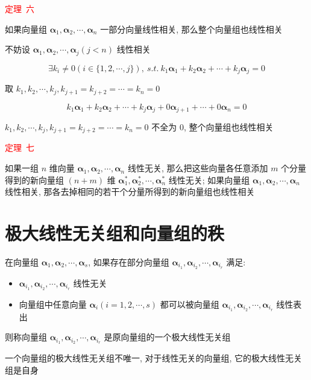 \begin{theorem}[判别线性相关性的七大定理]
	\textcolor{red}{定理\ 六}
	
	如果向量组 $\boldsymbol{\alpha}_{1},\boldsymbol{\alpha}_{2}, \cdots, \boldsymbol{\alpha}_{n}$ 一部分向量线性相关, 那么整个向量组也线性相关
	
	\begin{anymark}[证明]
		不妨设 $\boldsymbol{\alpha}_{1}, \boldsymbol{\alpha}_{2}, \cdots, \boldsymbol{\alpha}_{j}(j< n)$ 线性相关  
		
		$$\exists k_{i}\neq 0(i\in\{1,2,\cdots,j\}),\ s.t. \ k_{1}\boldsymbol{\alpha}_{1} + k_{2}\boldsymbol{\alpha}_{2} + \cdots + k_{j}\boldsymbol{\alpha}_{j}=0$$
		 
		取 $k_{1},k_{2},\cdots,k_{j},k_{j+1} = k_{j+2} = \cdots = k_{n} = 0$

		$$k_{1}\boldsymbol{\alpha}_{1} + k_{2}\boldsymbol{\alpha}_{2} + \cdots + k_{j}\boldsymbol{\alpha}_{j} + 0\boldsymbol{\alpha}_{j+1} + \cdots + 0\boldsymbol{\alpha}_{n}=0$$

		$k_{1},k_{2},\cdots,k_{j},k_{j+1}=k_{j+2}=\cdots=k_{n}=0$ 不全为 $0$, 整个向量组也线性相关
	\end{anymark}
	
	\textcolor{red}{定理\ 七}
	
	如果一组 $n$ 维向量 $\boldsymbol{\alpha}_{1},\boldsymbol{\alpha}_{2}, \cdots, \boldsymbol{\alpha}_{n}$ 线性无关,
	那么把这些向量各任意添加 $m$ 个分量得到的新向量组 $(n+m)$ 维 $\boldsymbol{\alpha}_{1}^{*},\boldsymbol{\alpha}_{2}^{*}, \cdots, \boldsymbol{\alpha}_{n}^{*}$ 线性无关;
	如果向量组 $\boldsymbol{\alpha}_{1}, \boldsymbol{\alpha}_{2}, \cdots, \boldsymbol{\alpha}_{n}$ 线性相关, 那各去掉相同的若干个分量所得到的新向量组也线性相关
\end{theorem}

\section{极大线性无关组和向量组的秩}
\begin{definition}[极大线性无关组]
	在向量组 $\boldsymbol{\alpha}_{1},\boldsymbol{\alpha}_{2}, \cdots, \boldsymbol{\alpha}_{s}$, 如果存在部分向量组 $\boldsymbol{\alpha}_{i_{1}}, \boldsymbol{\alpha}_{i_{2}}, \cdots, \boldsymbol{\alpha}_{i_{r}}$ 满足:  
	\begin{itemize}
		\item $\boldsymbol{\alpha}_{i_{1}},\boldsymbol{\alpha}_{i_{2}}, \cdots, \boldsymbol{\alpha}_{i_{r}}$ 线性无关
		\item 向量组中任意向量 $\boldsymbol{\alpha}_{i}(i=1,2,\cdots,s)$ 都可以被向量组 $\boldsymbol{\alpha}_{i_{1}},\boldsymbol{\alpha}_{i_{2}},\cdots,\boldsymbol{\alpha}_{i_{r}}$ 线性表出
	\end{itemize}
	则称向量组 $\boldsymbol{\alpha}_{i_{1}},\boldsymbol{\alpha}_{i_{2}},\cdots,\boldsymbol{\alpha}_{i_{r}}$ 是原向量组的一个极大线性无关组
	
	一个向量组的极大线性无关组不唯一, 对于线性无关的向量组, 它的极大线性无关组是自身
\end{definition}

